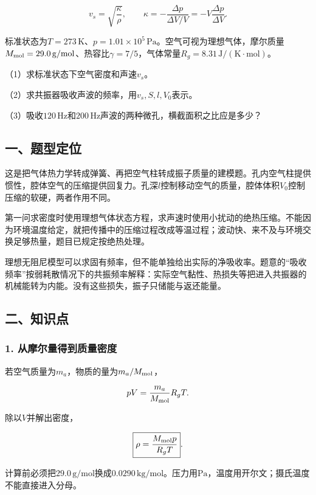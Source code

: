 \documentclass[12pt,a4paper,fontset=fandol]{ctexart}
\begin{document}
\[
v_s=\sqrt{\frac{\kappa}{\rho}},
\qquad
\kappa=-\frac{\Delta p}{\Delta V/V}
=-V\frac{\Delta p}{\Delta V}.
\]

标准状态为\(T=273\,\mathrm K\)、\(p=1.01\times10^5\,\mathrm{Pa}\)。空气可视为理想气体，摩尔质量\(M_{\rm mol}=29.0\,\mathrm{g/mol}\)、热容比\(\gamma=7/5\)，气体常量\(R_g=8.31\,\mathrm{J/(K\cdot mol)}\)。

（1）求标准状态下空气密度和声速\(v_s\)。

（2）求共振器吸收声波的频率，用\(v_s,S,l,V_0\)表示。

（3）吸收\(120\,\mathrm{Hz}\)和\(200\,\mathrm{Hz}\)声波的两种微孔，横截面积之比应是多少？

\subsection{一、题型定位}\label{ux4e00ux9898ux578bux5b9aux4f4d-3}

这是把气体热力学转成弹簧、再把空气柱转成振子质量的建模题。孔内空气柱提供惯性，腔体空气的压缩提供回复力。孔深\(l\)控制移动空气的质量，腔体体积\(V_0\)控制压缩的软硬，两者作用不同。

第一问求密度时使用理想气体状态方程，求声速时使用小扰动的绝热压缩。不能因为环境温度给定，就把传播中的压缩过程改成等温过程；波动快、来不及与环境交换足够热量，题目已规定按绝热处理。

理想无阻尼模型可以求固有频率，但不能单独给出实际的净吸收率。题意的``吸收频率''按弱耗散情况下的共振频率解释：实际空气黏性、热损失等把进入共振器的机械能转为内能。没有这些损失，振子只储能与返还能量。

\subsection{二、知识点}\label{ux4e8cux77e5ux8bc6ux70b9-3}

\subsubsection{1.
从摩尔量得到质量密度}\label{ux4eceux6469ux5c14ux91cfux5f97ux5230ux8d28ux91cfux5bc6ux5ea6}

若空气质量为\(m_a\)，物质的量为\(m_a/M_{\rm mol}\)，

\[
pV=\frac{m_a}{M_{\rm mol}}R_gT.
\]

除以\(V\)并解出密度，

\[
\boxed{\rho=\frac{M_{\rm mol}p}{R_gT}}.
\]

计算前必须把\(29.0\,\mathrm{g/mol}\)换成\(0.0290\,\mathrm{kg/mol}\)。压力用\(\mathrm{Pa}\)，温度用开尔文；摄氏温度不能直接进入分母。
\end{document}

